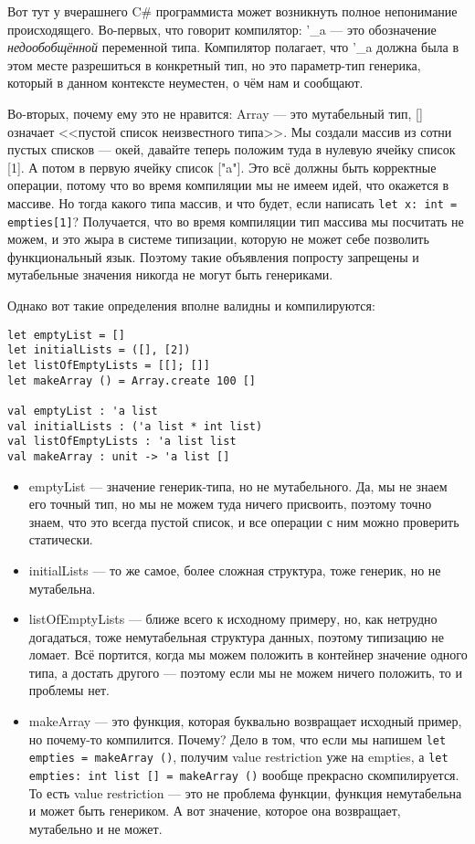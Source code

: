 \documentclass[a5paper]{article}
\begin{document}
Вот тут у вчерашнего C\# программиста может возникнуть полное непонимание происходящего. Во-первых, что говорит компилятор: '\_a --- это обозначение \emph{недообобщённой} переменной типа. Компилятор полагает, что '\_a должна была в этом месте разрешиться в конкретный тип, но это параметр-тип генерика, который в данном контексте неуместен, о чём нам и сообщают.

Во-вторых, почему ему это не нравится: Array --- это мутабельный тип, [] означает <<пустой список неизвестного типа>>. Мы создали массив из сотни пустых списков --- окей, давайте теперь положим туда в нулевую ячейку список [1]. А потом в первую ячейку список ["a"]. Это всё должны быть корректные операции, потому что во время компиляции мы не имеем идей, что окажется в массиве. Но тогда какого типа массив, и что будет, если написать \texttt{let x: int = empties[1]}? Получается, что во время компиляции тип массива мы посчитать не можем, и это жыра в системе типизации, которую не может себе позволить функциональный язык. Поэтому такие объявления попросту запрещены и мутабельные значения никогда не могут быть генериками.

Однако вот такие определения вполне валидны и компилируются:

\begin{verbatim}
let emptyList = []
let initialLists = ([], [2])
let listOfEmptyLists = [[]; []]
let makeArray () = Array.create 100 []

val emptyList : 'a list
val initialLists : ('a list * int list)
val listOfEmptyLists : 'a list list
val makeArray : unit -> 'a list []
\end{verbatim}

\begin{itemize}
    \item emptyList --- значение генерик-типа, но не мутабельного. Да, мы не знаем его точный тип, но мы не можем туда ничего присвоить, поэтому точно знаем, что это всегда пустой список, и все операции с ним можно проверить статически.
    \item initialLists --- то же самое, более сложная структура, тоже генерик, но не мутабельна.
    \item listOfEmptyLists --- ближе всего к исходному примеру, но, как нетрудно догадаться, тоже немутабельная структура данных, поэтому типизацию не ломает. Всё портится, когда мы можем положить в контейнер значение одного типа, а достать другого --- поэтому если мы не можем ничего положить, то и проблемы нет.
    \item makeArray --- это функция, которая буквально возвращает исходный пример, но почему-то компилится. Почему? Дело в том, что если мы напишем \texttt{let empties = makeArray ()}, получим value restriction уже на empties, а \texttt{let empties: int list [] = makeArray ()} вообще прекрасно скомпилируется. То есть value restriction --- это не проблема функции, функция немутабельна и может быть генериком. А вот значение, которое она возвращает, мутабельно и не может.
\end{itemize}
\end{document}
